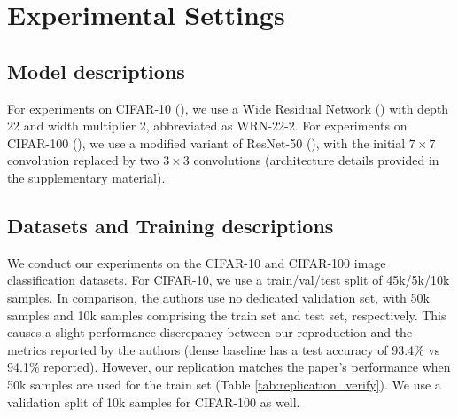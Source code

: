 \section{Experimental Settings}

\subsection{Model descriptions}

For experiments on CIFAR-10 (\citet{Krizhevsky09learningmultiple}), we use a Wide Residual Network (\citet{Wide_ResNet_BMVC2016_87}) with depth 22 and width multiplier 2, abbreviated as WRN-22-2. For experiments on CIFAR-100 (\citet{Krizhevsky09learningmultiple}), we use a modified variant of ResNet-50 (\citet{He_2016_CVPR}), with the initial $7\times 7$ convolution replaced by two $3 \times 3$ convolutions (architecture details provided in the supplementary material). 

\subsection{Datasets and Training descriptions}

We conduct our experiments on the CIFAR-10 and CIFAR-100 image classification datasets. For CIFAR-10, we use a train/val/test split of 45k/5k/10k samples. In comparison, the authors use no dedicated validation set, with 50k samples and 10k samples comprising the train set and test set, respectively. This causes a slight performance discrepancy between our reproduction and the metrics reported by the authors (dense baseline has a test accuracy of 93.4\% vs 94.1\% reported). However, our replication matches the paper's performance when 50k samples are used for the train set (Table \ref{tab:replication_verify}). We use a validation split of 10k samples for CIFAR-100 as well.

